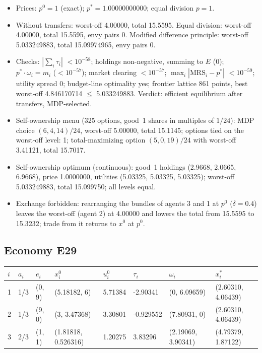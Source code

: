 \begin{itemize}[leftmargin=1.2em,itemsep=0pt,topsep=2pt]\footnotesize
\item Prices: $p^0 = 1$ (exact); $p^* = 1.00000000000$; equal division $p = 1$.
\item Without transfers: worst-off 4.00000, total 15.5595. Equal division: worst-off 4.00000, total 15.5595, envy pairs 0. Modified difference principle: worst-off 5.033249883, total 15.09974965, envy pairs 0.
\item Checks: $|\sum_i\tau_i|$ $<10^{-58}$; holdings non-negative, summing to $E$ (0); $p^*\cdot\omega_i = m_i$ ($<10^{-57}$); market clearing $<10^{-57}$; $\max_i|\mathrm{MRS}_i - p^*|$ $<10^{-59}$; utility spread 0; budget-line optimality yes; frontier lattice 861 points, best worst-off 4.846170714 $\leq$ 5.033249883. Verdict: efficient equilibrium after transfers, MDP-selected.
\item Self-ownership menu (325 options, good~1 shares in multiples of $1/24$): MDP choice $(6, 4, 14)/24$, worst-off 5.00000, total 15.1145; options tied on the worst-off level: 1; total-maximizing option $(5, 0, 19)/24$ with worst-off 3.41121, total 15.7017.
\item Self-ownership optimum (continuous): good~1 holdings (2.9668, 2.0665, 6.9668), price 1.0000000, utilities (5.03325, 5.03325, 5.03325); worst-off 5.033249883, total 15.099750; all levels equal.
\item Exchange forbidden: rearranging the bundles of agents 3 and 1 at $p^0$ ($\delta = 0.4$) leaves the worst-off (agent 2) at 4.00000 and lowers the total from 15.5595 to 15.3232; trade from it returns to $x^0$ at $p^0$.
\end{itemize}

\subsection*{Economy E29}
\label{ec:E29}
{\scriptsize\setlength{\tabcolsep}{3pt}
\begin{tabular}{@{}llllllll@{}}
\toprule
$i$ & $a_i$ & $e_i$ & $x^0_i$ & $u^0_i$ & $\tau_i$ & $\omega_i$ & $x^*_i$ \\
\midrule
1 & 1/3 & (0, 9) & (5.18182, 6) & 5.71384 & -2.90341 & (0, 6.09659) & (2.60310, 4.06439) \\
2 & 1/3 & (9, 0) & (3, 3.47368) & 3.30801 & -0.929552 & (7.80931, 0) & (2.60310, 4.06439) \\
3 & 2/3 & (1, 1) & (1.81818, 0.526316) & 1.20275 & 3.83296 & (2.19069, 3.90341) & (4.79379, 1.87122) \\
\bottomrule\end{tabular}}


